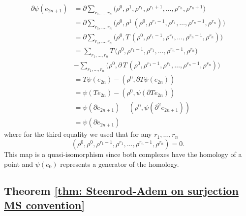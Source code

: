 \documentclass[A4]{amsart}
\theoremstyle{definition}
\begin{document}
\begin{align*}
\partial \psi(e_{2n+1}) & = 
\partial \sum_{r_1, \dots, r_n} 
\big(\rho^0, \rho^1, \rho^{r_1}, \rho^{r_1+1}, \dots, \rho^{r_n}, \rho^{r_n+1} \big)  \\ & =
\partial \sum_{r_1, \dots, r_n}
\big(\rho^0, \rho^{1} \, (\rho^0, \rho^{r_1-1}, \rho^{r_1}, \dots, \rho^{r_n - 1}, \rho^{r_n}) \big) \\ & =
\partial \sum_{r_1, \dots, r_n}
\big(\rho^0, T\, (\rho^0, \rho^{r_1-1}, \rho^{r_1}, \dots, \rho^{r_n - 1}, \rho^{r_n}) \big) \\ & =
\sum_{r_1, \dots, r_n}
T \, \big( \rho^0, \rho^{r_1-1}, \rho^{r_1}, \dots, \rho^{r_n - 1}, \rho^{r_n} \big) \\ & -
\sum_{r_1, \dots, r_n}
\big(\rho^0, \partial \, T \, (\rho^0, \rho^{r_1-1}, \rho^{r_1}, \dots, \rho^{r_n - 1}, \rho^{r_n}) \big) \\ & =
T \psi(e_{2n}) - (\rho^0, \partial T \psi (e_{2n})) \\ & =
\psi(T e_{2n}) - (\rho^0, \psi (\partial T e_{2n})) \\ & =
\psi(\partial e_{2n+1}) - (\rho^0, \psi (\partial^2 e_{2n+1})) \\ & =
\psi(\partial e_{2n+1})
\end{align*}
where for the third equality we used that for any $r_1, \dots, r_n$
\begin{equation*}
(\rho^0, \rho^0, \rho^{r_1-1}, \rho^{r_1}, \dots, \rho^{r_n - 1}, \rho^{r_n}) = 0.
\end{equation*}
This map is a quasi-isomorphism since both complexes have the homology of a point and $\psi(e_0)$ represents a generator of the homology.

\subsection{Theorem \ref{thm: Steenrod-Adem on surjection MS convention}}
\end{document}
